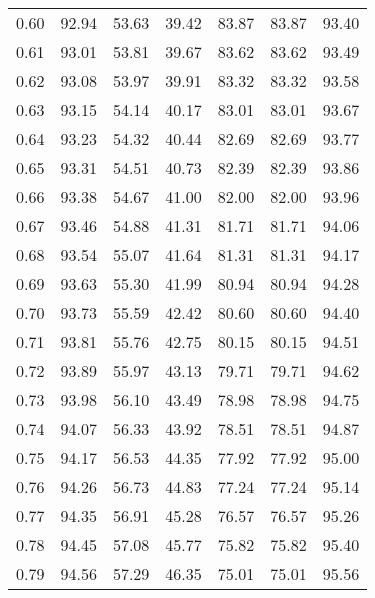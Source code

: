 \begin{tabular}{|c|c|c|c|c|c|c|}
      0.60 &     92.94 &     53.63 &      39.42 &   83.87 &      83.87 &         93.40 \\
      0.61 &     93.01 &     53.81 &      39.67 &   83.62 &      83.62 &         93.49 \\
      0.62 &     93.08 &     53.97 &      39.91 &   83.32 &      83.32 &         93.58 \\
      0.63 &     93.15 &     54.14 &      40.17 &   83.01 &      83.01 &         93.67 \\
      0.64 &     93.23 &     54.32 &      40.44 &   82.69 &      82.69 &         93.77 \\
      0.65 &     93.31 &     54.51 &      40.73 &   82.39 &      82.39 &         93.86 \\
      0.66 &     93.38 &     54.67 &      41.00 &   82.00 &      82.00 &         93.96 \\
      0.67 &     93.46 &     54.88 &      41.31 &   81.71 &      81.71 &         94.06 \\
      0.68 &     93.54 &     55.07 &      41.64 &   81.31 &      81.31 &         94.17 \\
      0.69 &     93.63 &     55.30 &      41.99 &   80.94 &      80.94 &         94.28 \\
      0.70 &     93.73 &     55.59 &      42.42 &   80.60 &      80.60 &         94.40 \\
      0.71 &     93.81 &     55.76 &      42.75 &   80.15 &      80.15 &         94.51 \\
      0.72 &     93.89 &     55.97 &      43.13 &   79.71 &      79.71 &         94.62 \\
      0.73 &     93.98 &     56.10 &      43.49 &   78.98 &      78.98 &         94.75 \\
      0.74 &     94.07 &     56.33 &      43.92 &   78.51 &      78.51 &         94.87 \\
      0.75 &     94.17 &     56.53 &      44.35 &   77.92 &      77.92 &         95.00 \\
      0.76 &     94.26 &     56.73 &      44.83 &   77.24 &      77.24 &         95.14 \\
      0.77 &     94.35 &     56.91 &      45.28 &   76.57 &      76.57 &         95.26 \\
      0.78 &     94.45 &     57.08 &      45.77 &   75.82 &      75.82 &         95.40 \\
      0.79 &     94.56 &     57.29 &      46.35 &   75.01 &      75.01 &         95.56 \\

\end{tabular}
